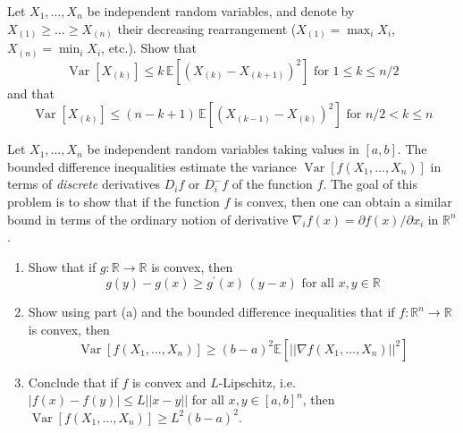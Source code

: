 \documentclass{article}
\DeclareMathOperator{\Var}{Var}
\theoremstyle{definition}
\theoremstyle{remark}
\theoremstyle{definition}
\begin{document}
  \begin{exercise}
  Let $X_1, \ldots, X_n$ be independent random variables, and denote by $X_{(1)} \geq \ldots \geq X_{(n)}$ their decreasing rearrangement ($X_{(1)} = \max_i X_i$, $X_{(n)} = \min_i X_i$, etc.). Show that 
  \[\Var[X_{(k)}] \leq k \, \mathbb{E}[(X_{(k)} - X_{(k+1)})^2] \text{ for } 1 \leq k \leq n/2\]
  and that 
  \[\Var[X_{(k)}] \leq (n - k + 1)\, \mathbb{E}[(X_{(k-1)} - X_{(k)})^2] \text{ for } n/2 < k \leq n\]
  \end{exercise}

  \begin{exercise}
  Let $X_1, \ldots, X_n$ be independent random variables taking values in $[a, b]$. The bounded difference inequalities estimate the variance $\Var[f(X_1, \ldots, X_n)]$ in terms of \textit{discrete} derivatives $D_i f$ or $D_i^- f$ of the function $f$. The goal of this problem is to show that if the function $f$ is convex, then one can obtain a similar bound in terms of the ordinary notion of derivative $\nabla_i f(x) = \partial f(x)/\partial x_i$ in $\mathbb{R}^n$. 
  \begin{enumerate}
      \item Show that if $g: \mathbb{R} \longrightarrow \mathbb{R}$ is convex, then 
      \[g(y) - g(x) \geq g^\prime (x)\, (y - x) \text{ for all } x, y \in \mathbb{R}\]
      
      \item Show using part (a) and the bounded difference inequalities that if $f: \mathbb{R}^n \rightarrow \mathbb{R}$ is convex, then 
      \[\Var[f(X_1, \ldots, X_n)] \geq (b - a)^2 \mathbb{E}[ ||\nabla f (X_1, \ldots, X_n)||^2]\]
      
      \item Conclude that if $f$ is convex and $L$-Lipschitz, i.e. $|f(x) - f(y)| \leq L ||x - y||$ for all $x, y \in [a, b]^n$, then $\Var[f(X_1, \ldots, X_n)] \geq L^2 (b - a)^2$. 
  \end{enumerate}
  \end{exercise}
\end{document}
